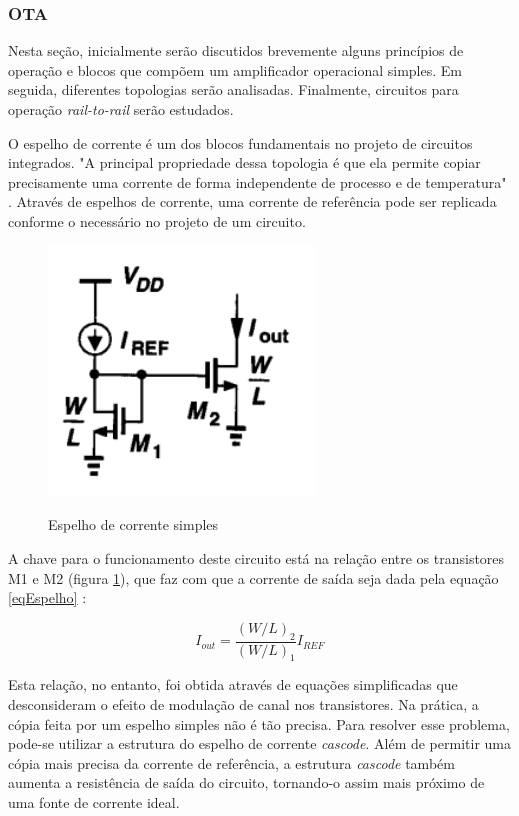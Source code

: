 \documentclass[
	12pt,				%
	oneside,			%
	a4paper,			%
	english,			%
	french,				%
	spanish,			%
	brazil				%
	]{abntex2}
\begin{document}
\subsubsection{OTA}
Nesta seção, inicialmente serão discutidos brevemente alguns princípios de operação e blocos que compõem um amplificador operacional simples. Em seguida, diferentes topologias serão analisadas. Finalmente, circuitos para operação \textit{rail-to-rail} serão estudados.

O espelho de corrente é um dos blocos fundamentais no projeto de circuitos integrados. "A principal propriedade dessa topologia é que ela permite copiar precisamente uma corrente de forma independente de processo e de temperatura" \cite{razavi}. Através de espelhos de corrente, uma corrente de referência pode ser replicada conforme o necessário no projeto de um circuito.

\begin{figure}[!ht]
  \centering
  \includegraphics[width=200pt]{espelho.PNG}\\
  \caption{Espelho de corrente simples}\label{espelhoSimples}
\end{figure}

A chave para o funcionamento deste circuito está na relação entre os transistores M1 e M2 (figura \ref{espelhoSimples}), que faz com que a corrente de saída seja dada pela equação \ref{eqEspelho} \cite{razavi}:

\begin{equation}\label{eqEspelho}
I_{out} = \frac{(W/L)_2}{(W/L)_1}I_{REF}
\end{equation}

Esta relação, no entanto, foi obtida através de equações simplificadas que desconsideram o efeito de modulação de canal nos transistores. Na prática, a cópia feita por um espelho simples não é tão precisa. Para resolver esse problema, pode-se utilizar a estrutura do espelho de corrente \textit{cascode}. Além de permitir uma cópia mais precisa da corrente de referência, a estrutura \textit{cascode} também aumenta a resistência de saída do circuito, tornando-o assim mais próximo de uma fonte de corrente ideal.
\end{document}
